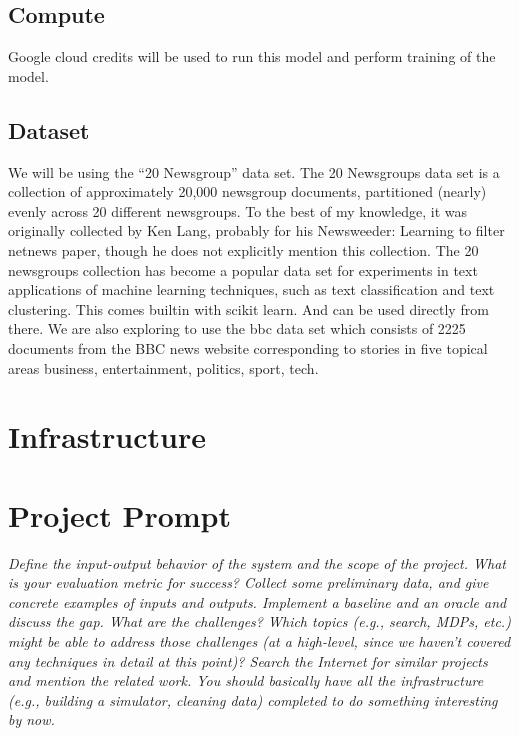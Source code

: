 \documentclass{article}
\begin{document}
\subsection*{Compute}
Google cloud credits will be used to run this model and perform training of the model. 

\subsection*{Dataset}
We will be using the “20 Newsgroup” data set. The 20 Newsgroups data set is a collection of approximately 20,000 newsgroup documents, partitioned (nearly) evenly across 20 different newsgroups. To the best of my knowledge, it was originally collected by Ken Lang, probably for his Newsweeder: Learning to filter netnews paper, though he does not explicitly mention this collection. The 20 newsgroups collection has become a popular data set for experiments in text applications of machine learning techniques, such as text classification and text clustering. This comes builtin with scikit learn. And can be used directly from there. \newline
We are also exploring to use the bbc data set which consists of 2225 documents from the BBC news website corresponding to stories in five topical areas business, entertainment, politics, sport, tech. 

\maketitle %


\section*{Infrastructure} %

\section*{Project Prompt}

\textit{Define the input-output behavior of the system and the scope of the project. What is your evaluation metric for success? Collect some preliminary data, and give concrete examples of inputs and outputs. Implement a baseline and an oracle and discuss the gap. What are the challenges? Which topics (e.g., search, MDPs, etc.) might be able to address those challenges (at a high-level, since we haven't covered any techniques in detail at this point)? Search the Internet for similar projects and mention the related work. You should basically have all the infrastructure (e.g., building a simulator, cleaning data) completed to do something interesting by now.}
\end{document}
